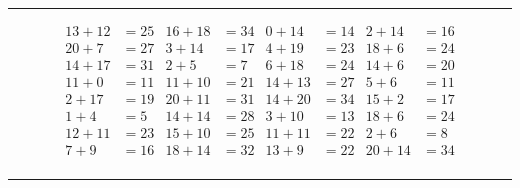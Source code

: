 \documentclass{article}
\begin{document}
\begin{sloppy}
\hrule
\begin{align*}
    {13} + {12} &= {25} & {16} + {18} &= {34} & {0} + {14} &= {14} & {2} + {14} &= {16} \\
    {20} + {7} &= {27} & {3} + {14} &= {17} & {4} + {19} &= {23} & {18} + {6} &= {24} \\
    {14} + {17} &= {31} & {2} + {5} &= {7} & {6} + {18} &= {24} & {14} + {6} &= {20} \\
    {11} + {0} &= {11} & {11} + {10} &= {21} & {14} + {13} &= {27} & {5} + {6} &= {11} \\
    {2} + {17} &= {19} & {20} + {11} &= {31} & {14} + {20} &= {34} & {15} + {2} &= {17} \\
    {1} + {4} &= {5} & {14} + {14} &= {28} & {3} + {10} &= {13} & {18} + {6} &= {24} \\
    {12} + {11} &= {23} & {15} + {10} &= {25} & {11} + {11} &= {22} & {2} + {6} &= {8} \\
    {7} + {9} &= {16} & {18} + {14} &= {32} & {13} + {9} &= {22} & {20} + {14} &= {34} \\
\end{align*}
\hrule
\end{sloppy}
\end{document}
